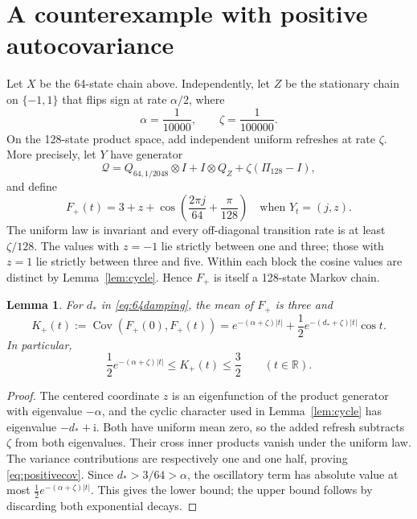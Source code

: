 \documentclass[11pt,reqno]{amsart}
\numberwithin{equation}{section}
\theoremstyle{plain}
\newtheorem{lemma}[theorem]{Lemma}
\theoremstyle{definition}
\newcommand{\R}{\mathbb R}
\newcommand{\1}{\mathbf 1}
\newcommand{\ii}{\mathrm i}
\DeclareMathOperator{\Cov}{Cov}
\begin{document}
\section{A counterexample with positive autocovariance}\label{sec:positive}
Let $X$ be the 64-state chain above. Independently, let $Z$ be the stationary chain on $\{-1,1\}$ that flips sign at rate $\alpha/2$, where
\begin{equation}\label{eq:positiverates}
 \alpha=\frac1{10000},\qquad \zeta=\frac1{100000}.
\end{equation}
On the 128-state product space, add independent uniform refreshes at rate $\zeta$. More precisely, let $Y$ have generator
\begin{equation}\label{eq:positivegenerator}
 \mathcal Q=Q_{64,1/2048}\otimes I+I\otimes Q_Z
                  +\zeta(\Pi_{128}-I),
\end{equation}
and define
\begin{equation}\label{eq:positiveF}
 F_+(t)=3+z+\cos\left(\frac{2\pi j}{64}+\frac\pi{128}\right)
 \quad\text{when }Y_t=(j,z).
\end{equation}
The uniform law is invariant and every off-diagonal transition rate is at least $\zeta/128$. The values with $z=-1$ lie strictly between one and three; those with $z=1$ lie strictly between three and five. Within each block the cosine values are distinct by Lemma~\ref{lem:cycle}. Hence $F_+$ is itself a 128-state Markov chain.

\begin{lemma}\label{lem:positivecov}
For $d_*$ in \eqref{eq:64damping}, the mean of $F_+$ is three and
\begin{equation}\label{eq:positivecov}
 K_+(t):=\Cov(F_+(0),F_+(t))
 =e^{-(\alpha+\zeta)|t|}
       +\frac12e^{-(d_*+\zeta)|t|}\cos t.
\end{equation}
In particular,
\begin{equation}\label{eq:positivecovbound}
 \frac12e^{-(\alpha+\zeta)|t|}\le K_+(t)\le\frac32
 \qquad(t\in\R).
\end{equation}
\end{lemma}
\begin{proof}
The centered coordinate $z$ is an eigenfunction of the product generator with eigenvalue $-\alpha$, and the cyclic character used in Lemma~\ref{lem:cycle} has eigenvalue $-d_*+\ii$. Both have uniform mean zero, so the added refresh subtracts $\zeta$ from both eigenvalues. Their cross inner products vanish under the uniform law. The variance contributions are respectively one and one half, proving \eqref{eq:positivecov}. Since $d_*>3/64>\alpha$, the oscillatory term has absolute value at most $\tfrac12e^{-(\alpha+\zeta)|t|}$. This gives the lower bound; the upper bound follows by discarding both exponential decays.
\end{proof}
\end{document}
